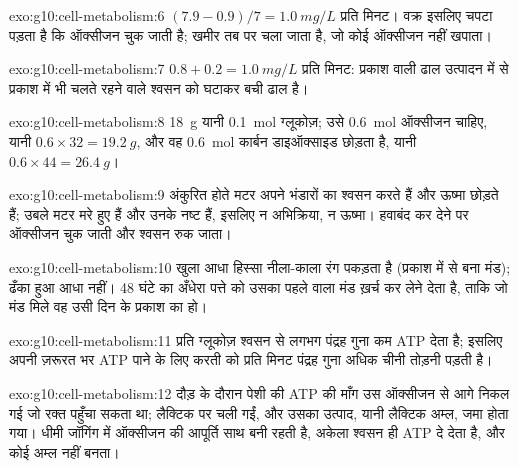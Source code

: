 \begin{solution}{exo:g10:cell-metabolism:6}
$(7.9 - 0.9)/7 = \qty{1.0}{mg/L}$ प्रति मिनट। वक्र इसलिए चपटा पड़ता है
कि ऑक्सीजन चुक जाती है; खमीर तब  पर चला जाता है, जो कोई ऑक्सीजन
नहीं खपाता।
\end{solution}

\begin{solution}{exo:g10:cell-metabolism:7}
$0.8 + 0.2 = \qty{1.0}{mg/L}$ प्रति मिनट: प्रकाश वाली ढाल उत्पादन में से
प्रकाश में भी चलते रहने वाले श्वसन को घटाकर बची ढाल है।
\end{solution}

\begin{solution}{exo:g10:cell-metabolism:8}
\qty{18}{g} यानी \qty{0.1}{mol} ग्लूकोज़; उसे \qty{0.6}{mol} ऑक्सीजन
चाहिए, यानी $0.6 \times 32 = \qty{19.2}{g}$, और वह \qty{0.6}{mol} कार्बन
डाइऑक्साइड छोड़ता है, यानी $0.6 \times 44 = \qty{26.4}{g}$।
\end{solution}

\begin{solution}{exo:g10:cell-metabolism:9}
अंकुरित होते मटर अपने भंडारों का श्वसन करते हैं और ऊष्मा छोड़ते हैं; उबले
मटर मरे हुए हैं और उनके  नष्ट हैं, इसलिए न अभिक्रिया, न ऊष्मा।
हवाबंद कर देने पर ऑक्सीजन चुक जाती और श्वसन रुक जाता।
\end{solution}

\begin{solution}{exo:g10:cell-metabolism:10}
खुला आधा हिस्सा नीला-काला रंग पकड़ता है (प्रकाश में  से बना
मंड); ढँका हुआ आधा नहीं। 48 घंटे का अँधेरा पत्ते को उसका पहले वाला मंड
ख़र्च कर लेने देता है, ताकि जो मंड मिले वह उसी दिन के प्रकाश का हो।
\end{solution}

\begin{solution}{exo:g10:cell-metabolism:11}
 प्रति ग्लूकोज़ श्वसन से लगभग पंद्रह गुना कम ATP देता है; इसलिए
अपनी ज़रूरत भर ATP पाने के लिए  करती  को प्रति मिनट पंद्रह
गुना अधिक चीनी तोड़नी पड़ती है।
\end{solution}

\begin{solution}{exo:g10:cell-metabolism:12}
दौड़ के दौरान पेशी की ATP की माँग उस ऑक्सीजन से आगे निकल गई जो रक्त
पहुँचा सकता था;  लैक्टिक  पर चली गईं, और उसका उत्पाद, यानी
लैक्टिक अम्ल, जमा होता गया। धीमी जॉगिंग में ऑक्सीजन की आपूर्ति साथ बनी
रहती है, अकेला श्वसन ही ATP दे देता है, और कोई अम्ल नहीं बनता।
\end{solution}


